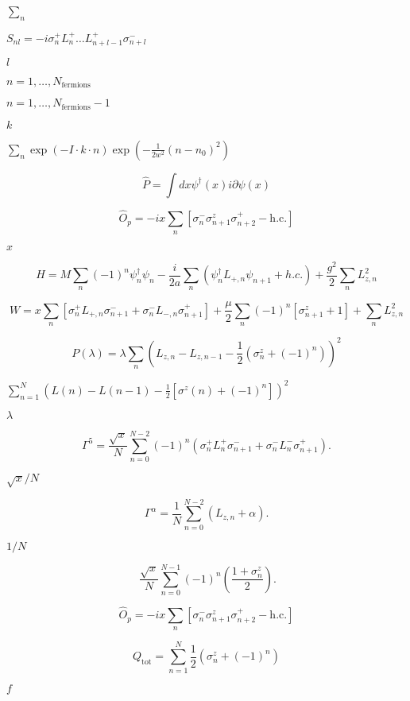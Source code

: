 \documentclass{article}
\begin{document}
{$ \sum_n $
\pagebreak

$ S_{nl} = -i\sigma^+_nL^+_n\dots L^+_{n+l-1}\sigma^-_{n+l} $
\pagebreak

$ l $
\pagebreak

$ n=1,\dots,N_\mathrm{fermions}$
\pagebreak

$ n=1,\dots,N_\mathrm{fermions}-1$
\pagebreak

$ k $
\pagebreak

$ \sum_n \exp(-I\cdot k\cdot n)\exp\left(-\frac{1}{2w^2}(n-n_0)^2\right) $
\pagebreak

\[
   \hat{P}=\int dx \psi^\dagger(x)i\partial\psi(x)
\]
\pagebreak

\[
   \hat{O}_p=-ix\sum_n\left[\sigma_n^-\sigma_{n+1}^z\sigma_{n+2}^+ - \mathrm{h.c.}\right]
\]
\pagebreak

$ x $
\pagebreak

\[ H = M\sum_n (-1)^n\psi_n^\dagger\psi_n - \frac{i}{2a}\sum_n \left(\psi_n^\dagger L_{+,n}\psi_{n+1}+h.c.\right)+\frac{g^2}{2}\sum_n L_{z,n}^2 \]
\pagebreak

\[W = x\sum_n\left[\sigma^+_n L_{+,n}\sigma_{n+1}^- + \sigma^-_n L_{-,n}\sigma_{n+1}^+\right] + \frac{\mu}{2}\sum_n(-1)^n\left[ \sigma^z_{n+1}+1\right] + \sum_n L_{z,n}^2  \]
\pagebreak

\[P(\lambda)= \lambda \sum_n\left( L_{z,n} - L_{z,n-1} -\frac{1}{2}\left(\sigma^z_n +(-1)^n\right)\right)^2 \]
\pagebreak

$ \sum_{n=1}^{N}\left(L(n)-L(n-1)-\frac{1}{2}\left[\sigma^z(n)+(-1)^n\right]\right)^2 $
\pagebreak

$ \lambda $
\pagebreak

\[
\Gamma^5 = \frac{\sqrt{x}}{N}\sum_{n=0}^{N-2}(-1)^n\left(\sigma_n^+L^+_n\sigma^-_{n+1} + \sigma_n^-L^-_n\sigma^+_{n+1} \right).
\]
\pagebreak

$ \sqrt{x}/N $
\pagebreak

\[
\Gamma^\alpha = \frac{1}{N}\sum_{n=0}^{N-2}\left(L_{z,n}+\alpha \right).
\]
\pagebreak

$ 1/N $
\pagebreak

\[
\ \frac{\sqrt{x}}{N}\sum_{n=0}^{N-1}(-1)^n\left(\frac{1+\sigma_n^z}{2}\right).
\]
\pagebreak

\[
  \hat{O}_p=-ix\sum_n\left[\sigma_n^-\sigma_{n+1}^z\sigma_{n+2}^+ - \mathrm{h.c.}\right]
\]
\pagebreak

\[
Q_\mathrm{tot}= \sum_{n=1}^{N} \frac{1}{2}\left(\sigma^z_n +(-1)^n\right) 
\]
\pagebreak

$ f $
\pagebreak

}
\end{document}
